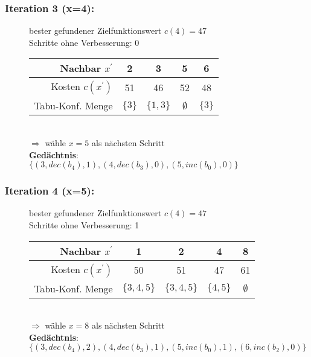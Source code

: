 \documentclass[12pt]{article}
\begin{document}
	\subsubsection*{Iteration 3 (x=4):}
	\begin{figure}[H]
		\centering
		bester gefundener Zielfunktionswert $c(4)=47$\\
		Schritte ohne Verbesserung: 0\\
		\begin{tabular}{r | cccc}
			Nachbar $x^\prime$   & 2 & 3 & 5 & 6\\ \hline
			Kosten $c(x^\prime)$ & 51 & 46 & 52 & 48 \\\hline
			Tabu-Konf. Menge     & $\{3\}$ & $\{1,3\}$ & $\emptyset$ & $\{3\}$\\
		\end{tabular}\\
		$\Rightarrow $ wähle $x=5$ als nächsten Schritt\\
		\textbf{Gedächtnis}: $\{(3, dec(b_4),1), (4, dec(b_3),0), (5, inc(b_0),0)\}$
	\end{figure}

	\subsubsection*{Iteration 4 (x=5):}
	\begin{figure}[H]
		\centering
		bester gefundener Zielfunktionswert $c(4)=47$\\
		Schritte ohne Verbesserung: 1\\
		\begin{tabular}{r | cccc}
			Nachbar $x^\prime$   & 1 & 2 & 4 & 8\\\hline
			Kosten $c(x^\prime)$ & 50 & 51 & 47 & 61\\\hline
			Tabu-Konf. Menge     & $\{3,4,5\}$ & $\{3,4,5\}$ & $\{4,5\}$ & $\emptyset$ \\
		\end{tabular}\\
		$\Rightarrow $ wähle $x=8$ als nächsten Schritt\\
		\textbf{Gedächtnis}: $\{(3, dec(b_4),2), (4, dec(b_3),1), (5, inc(b_0),1), (6, inc(b_2),0)\}$
	\end{figure}
\end{document}

